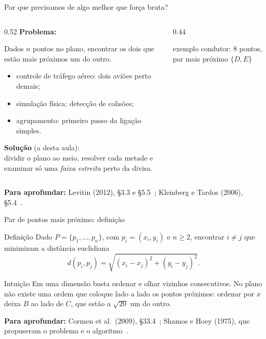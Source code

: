 \documentclass[aspectratio=169,xcolor=table]{beamer}
\newcommand{\pontosexemplo}{%
  \foreach \n/\x/\y/\p in {A/1/5/above left, B/2/9/above left, C/4/5/above left,
      D/5/8/above left, E/6/8/above right, F/8/8/above right, G/10/2/above left,
      H/11/9/above left}{%
    \node[pt] (\n) at (\x,\y) {};
    \node[ptlbl, \p] at (\n) {\n};
  }%
}
\newcommand{\fonte}[1]{%
  \vfill
  {\tiny\color{gray!55!black}\textbf{Para aprofundar:} #1\par}%
}
\begin{document}
\begin{frame}{Por que precisamos de algo melhor que força bruta?}
  \begin{columns}[T]
    \begin{column}{0.52\textwidth}
      \textbf{Problema:}\\[2pt]
      {\scriptsize
      Dados $n$ pontos no plano, encontrar os dois que estão mais
      próximos um do outro.
      \begin{itemize}\scriptsize
        \item controle de tráfego aéreo: dois aviões perto demais;
        \item simulação física: detecção de colisões;
        \item agrupamento: primeiro passo da ligação simples.
      \end{itemize}}

      \smallskip
      \textbf{Solução} (a desta aula):\\[2pt]
      {\scriptsize dividir o plano ao meio, resolver cada metade e
      examinar só uma \emph{faixa estreita} perto da divisa.}
    \end{column}
    \begin{column}{0.44\textwidth}
      \centering

      {\tiny exemplo condutor: 8 pontos, par mais próximo $\{D,E\}$}
    \end{column}
  \end{columns}
  \fonte{Levitin (2012), \S 3.3 e \S 5.5~\cite{levitin2012introduction};
    Kleinberg e Tardos (2006), \S 5.4~\cite{kleinberg2006algorithm}.}
\end{frame}

\begin{frame}{Par de pontos mais próximo: definição}
  \begin{block}{Definição}
    Dado $P=\{p_1,\dots,p_n\}$, com $p_i=(x_i,y_i)$ e $n\ge 2$, encontrar
    $i\neq j$ que minimizam a distância euclidiana
    \[
      d(p_i,p_j)=\sqrt{(x_i-x_j)^2+(y_i-y_j)^2}.
    \]
  \end{block}
  \begin{exampleblock}{Intuição}
    \scriptsize Em uma dimensão basta ordenar e olhar vizinhos consecutivos.
    No plano não existe uma ordem que coloque lado a lado os pontos
    próximos: ordenar por $x$ deixa $B$ ao lado de $C$, que estão a
    $\sqrt{20}$ um do outro.
  \end{exampleblock}
  \fonte{Cormen et al.\ (2009), \S 33.4~\cite{cormen2009introduction};
    Shamos e Hoey (1975), que propuseram o problema e o algoritmo~\cite{shamos1975closest}.}
\end{frame}
\end{document}
